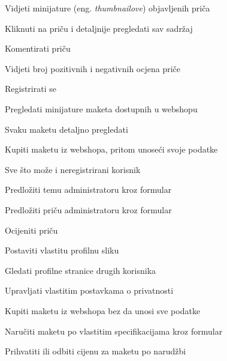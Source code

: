 			
			\begin{packed_enum}
				\item  {}
				
				\begin{packed_enum}
					
					\item Vidjeti minijature (eng. \textit{thumbnailove}) objavljenih priča
					\item Kliknuti na priču i detaljnije pregledati sav sadržaj
					\item Komentirati priču
					\item Vidjeti broj pozitivnih i negativnih ocjena priče
					\item Registrirati se
					\item Pregledati minijature maketa dostupnih u webshopu
					\item Svaku maketu detaljno pregledati
					\item Kupiti maketu iz webshopa, pritom unoseći svoje podatke
				\end{packed_enum}
			
				\item  {}
				
				\begin{packed_enum}
					
					\item Sve što može i neregistrirani korisnik
					\item Predložiti temu administratoru kroz formular
					\item Predložiti priču administratoru kroz formular
					\item Ocijeniti priču
					\item Postaviti vlastitu profilnu sliku
					\item Gledati profilne stranice drugih korisnika
					\item Upravljati vlastitim postavkama o privatnosti
					\item Kupiti maketu iz webshopa bez da unosi sve podatke
					\item Naručiti maketu po vlastitim specifikacijama kroz formular
					\item Prihvatiti ili odbiti cijenu za maketu po narudžbi

				\end{packed_enum}
							\item  {}
			

\end{packed_enum}
